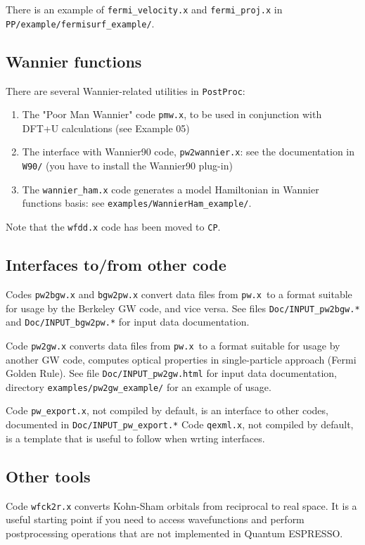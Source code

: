 \documentclass[12pt,a4paper]{article}
\def\qe{{\sc Quantum ESPRESSO}}
\def\pwx{\texttt{pw.x}}
\def\CP{\texttt{CP}}
\def\PostProc{\texttt{PostProc}}
\begin{document}
There is an example of \verb|fermi_velocity.x| and \verb|fermi_proj.x|
in \verb|PP/example/fermisurf_example/|.

\subsection{Wannier functions}

There are several Wannier-related utilities in \PostProc:
\begin{enumerate}
\item The "Poor Man Wannier" code \texttt{pmw.x}, to be used
in conjunction with DFT+U calculations (see Example 05)
\item The interface with Wannier90 code, \texttt{pw2wannier.x}:
see the documentation in \texttt{W90/} (you have to install the 
Wannier90 plug-in)
\item The \texttt{wannier\_ham.x} code generates a model Hamiltonian 
in Wannier functions basis: see \texttt{examples/WannierHam\_example/}.
\end{enumerate}
Note that the \texttt{wfdd.x} code has been moved to \CP.

\subsection{Interfaces to/from other code}

Codes \texttt{pw2bgw.x} and \texttt{bgw2pw.x} convert data files from
\pwx\ to a format suitable for usage by the Berkeley GW code, and vice
versa. See files \texttt{Doc/INPUT\_pw2bgw.*} and \texttt{Doc/INPUT\_bgw2pw.*}
for input data documentation.

Code \texttt{pw2gw.x} converts data files from \pwx\ to a format suitable 
for usage by another GW code, computes optical properties in single-particle 
approach (Fermi Golden Rule). See file \texttt{Doc/INPUT\_pw2gw.html}
for input data documentation, directory \texttt{examples/pw2gw\_example/}
for an example of usage.

Code \texttt{pw\_export.x}, not compiled by default, is an interface
to other codes, documented in \texttt{Doc/INPUT\_pw\_export.*}
Code \texttt{qexml.x}, not compiled by default, is a template that
is useful to follow when wrting interfaces.

\subsection{Other tools}

Code \texttt{wfck2r.x} converts Kohn-Sham orbitals from reciprocal to real 
space. It is a useful starting point if you need to access wavefunctions
and perform postprocessing operations that are not implemented in \qe.
\end{document}
